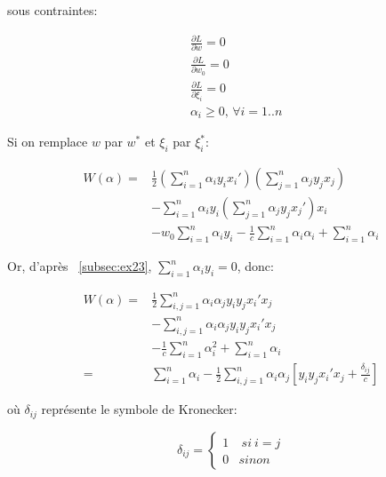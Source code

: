 \documentclass{article}
\begin{document}
\begin{multicols}{2}
sous contraintes:

\begin{equation}
    \begin{split}
        & \frac{\partial L}{\partial w} = 0 \\
        & \frac{\partial L}{\partial w_0} = 0 \\
        & \frac{\partial L}{\partial \xi_i} = 0 \\
        & \alpha_i \geq 0, \, \forall i = 1..n
    \end{split}
\end{equation}

Si on remplace $w$ par $w^*$ et $\xi_i$ par $\xi_i^*$:

\begin{equation}
    \begin{split}
        \textit{W}(\alpha) = & \frac{1}{2} (\sum_{i = 1}^n \alpha_i y_i x_i')
        (\sum_{j = 1}^n \alpha_j y_j x_j) \\
                             & - \sum_{i = 1}^n \alpha_i y_i (\sum_{j = 1}^n
        \alpha_j y_j x_j') x_i \\
                             & - w_0 \sum_{i = 1}^n \alpha_i y_i - \frac{1}{c}
        \sum_{i = 1}^n \alpha_i \alpha_i + \sum_{i = 1}^n \alpha_i
    \end{split}
\end{equation}

Or, d'après ~\ref{subsec:ex23}, $\sum_{i = 1}^n \alpha_i y_i = 0$, donc:

\begin{equation}
    \begin{split}
        \textit{W}(\alpha) = & \frac{1}{2} \sum_{i,j = 1}^{n} \alpha_i \alpha_j
        y_i y_j x_i' x_j \\
                             & - \sum_{i,j = 1}^{n} \alpha_i \alpha_j y_i y_j
        x_i' x_j \\
                             & - \frac{1}{c} \sum_{i = 1}^{n} \alpha_i^2 +
        \sum_{i = 1}^n \alpha_i \\
        = & \sum_{i = 1}^n \alpha_i - \frac{1}{2} \sum_{i,j = 1}^n \alpha_i
        \alpha_j [y_i y_j x_i' x_j + \frac{\delta_{ij}}{c}]
    \end{split}
\end{equation}

où $\delta_{ij}$ représente le symbole de Kronecker:

$$\delta_{ij}=
\begin{cases}
    1 &  \ si \ i=j\\
    0 & sinon
\end{cases}$$\\


\end{multicols}
\end{document}
